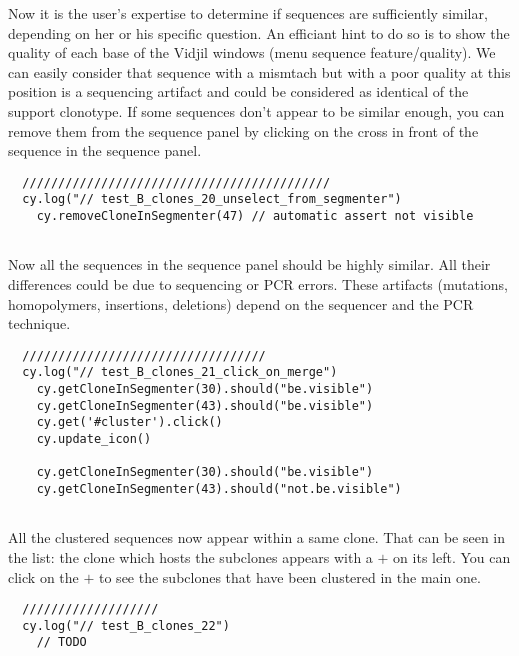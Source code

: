 Now it is the user's expertise to determine if sequences are sufficiently
similar, depending on her or his specific question. 
An efficiant hint to do so is to show the quality of each base of the Vidjil windows (menu sequence feature/quality). 
We can easily consider that sequence with a mismtach but with a poor quality at this position is a sequencing artifact and could be considered as identical of the support clonotype.
If some sequences don't appear to be similar enough, you can remove
them from the sequence panel by clicking on the cross in front of the sequence in
the sequence panel.
\begin{verbatim}
  ///////////////////////////////////////////
  cy.log("// test_B_clones_20_unselect_from_segmenter")
    cy.removeCloneInSegmenter(47) // automatic assert not visible


\end{verbatim}

Now all the sequences in the sequence panel should be highly similar. All their
differences could be due to sequencing or PCR errors.
These artifacts (mutations, homopolymers, insertions, deletions)
depend on the sequencer and the PCR technique.

\begin{verbatim}
  //////////////////////////////////
  cy.log("// test_B_clones_21_click_on_merge")
    cy.getCloneInSegmenter(30).should("be.visible")
    cy.getCloneInSegmenter(43).should("be.visible")
    cy.get('#cluster').click()
    cy.update_icon()

    cy.getCloneInSegmenter(30).should("be.visible")
    cy.getCloneInSegmenter(43).should("not.be.visible")


\end{verbatim}

All the clustered sequences now appear within a same clone. That can be seen
in the list: the clone which hosts the subclones appears with a $+$ on its
left. You can click on the $+$ to see the subclones that have been clustered in
the main one.
\begin{verbatim}
  ///////////////////
  cy.log("// test_B_clones_22")
    // TODO


\end{verbatim}

